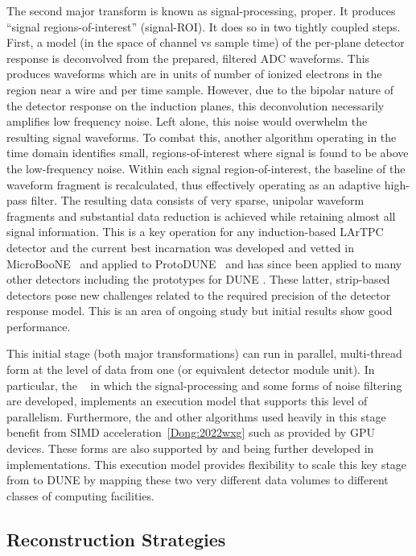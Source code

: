 \documentclass[../main-v1.tex]{subfiles}
\begin{document}
The second major transform is known as signal-processing, proper. 
It produces ``signal regions-of-interest'' (signal-ROI).
It does so in two tightly coupled steps. 
First, a \twod model (in the space of channel vs sample time) of the per-plane detector response is deconvolved from the prepared, filtered ADC waveforms. 
This produces waveforms which are in units of number of ionized electrons in the region near a wire and per time sample.
However, due to the bipolar nature of the detector response on the induction planes, this deconvolution necessarily amplifies low frequency noise.
Left alone, this noise would overwhelm the resulting signal waveforms.
To combat this, another algorithm operating in the time domain identifies small, regions-of-interest where signal is found to be above the low-frequency noise.
Within each signal region-of-interest, the baseline of the waveform fragment is recalculated, thus effectively operating as an adaptive high-pass filter.
The resulting data consists of very sparse, unipolar waveform fragments and substantial data reduction is achieved while retaining almost all signal information.
This is a key operation for any induction-based LArTPC detector and the current best incarnation was developed and vetted in MicroBooNE~\cite{Adams:2018dra,Adams:2018gbi} and applied to ProtoDUNE~\cite{ref:pdune_signal_processing} and has since been applied to many other detectors including the prototypes for DUNE . 
These latter, strip-based detectors pose new challenges related to the required precision of the detector response model. 
This is an area of ongoing study but initial results show good performance.

This initial stage (both major transformations) can run in parallel, multi-thread form at the level of data from one  (or equivalent detector module unit).
In particular, the ~\cite{wirecell,ref:wire_cell_toolkit} in which the signal-processing and some forms of noise filtering are developed, implements an execution model that supports this level of parallelism.
Furthermore, the  and other algorithms used heavily in this stage benefit from SIMD acceleration~\ref{Dong:2022wxg} such as provided by GPU devices. 
These forms are also supported by and being further developed in  implementations.
This execution model provides flexibility to scale this key stage from  to DUNE by mapping these two very different data volumes to different classes of computing facilities.


\subsection{Reconstruction Strategies}
\end{document}
